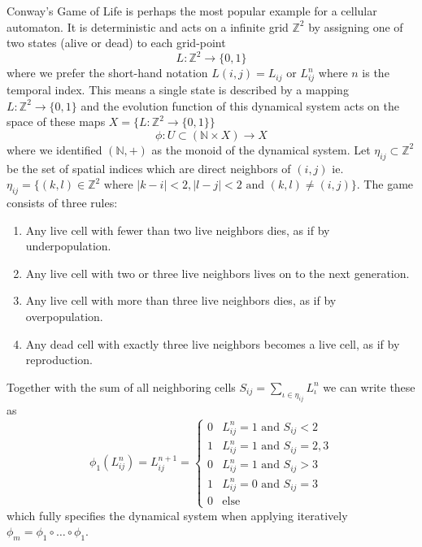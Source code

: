 \begin{example}
    \label{example:game-of-life}
    Conway's Game of Life is perhaps the most popular example for a cellular automaton.
    It is deterministic and acts on a infinite grid $\mathbb{Z}^2$ by assigning one of two states
    (alive or dead) to each grid-point
    \begin{equation}
        L:\mathbb{Z}^2\rightarrow\{0,1\}
    \end{equation}
    where we prefer the short-hand notation $L(i,j)=L_{ij}$ or $L^n_{ij}$ where $n$ is the temporal
    index.
    This means a single state is described by a mapping $L:\mathbb{Z}^2\rightarrow\{0,1\}$ and the
    evolution function of this dynamical system acts on the space of these maps
    $X=\{L:\mathbb{Z}^2\rightarrow\{0,1\}\}$
    \begin{equation}
        \phi:U\subset(\mathbb{N}\times X) \rightarrow X
    \end{equation}
    where we identified $(\mathbb{N},+)$ as the monoid of the dynamical system.
    Let $\eta_{ij}\subset\mathbb{Z}^2$ be the set of spatial indices which are direct neighbors of
    $(i,j)$ ie. $\eta_{ij}=\{(k,l)\in\mathbb{Z}^2 \text{ where } |k-i|<2, |l-j|<2 \text{ and }
    (k,l)\neq(i,j)\}$.
    The game consists of three rules:
    \begin{enumerate}
        \item Any live cell with fewer than two live neighbors dies, as if by underpopulation.
        \item Any live cell with two or three live neighbors lives on to the next generation.
        \item Any live cell with more than three live neighbors dies, as if by overpopulation.
        \item Any dead cell with exactly three live neighbors becomes a live cell, as if by
            reproduction.
    \end{enumerate}
    Together with the sum of all neighboring cells $S_{ij}=\sum\limits_{\iota\in\eta_{ij}}L^n_\iota$
    we can write these as
    \begin{equation}
        \phi_1(L_{ij}^n) = L_{ij}^{n+1} =
        \begin{cases}
            0 &L^n_{ij}=1 \text{ and } S_{ij}<2\\
            1 &L^n_{ij}=1 \text{ and } S_{ij}=2,3\\
            0 &L^n_{ij}=1 \text{ and } S_{ij}>3\\
            1 &L^n_{ij}=0 \text{ and } S_{ij}=3\\
            0 &\text{else}
        \end{cases}
    \end{equation}
    which fully specifies the dynamical system when applying iteratively
    $\phi_m=\phi_1\circ\dots\circ\phi_1$.
\end{example}

